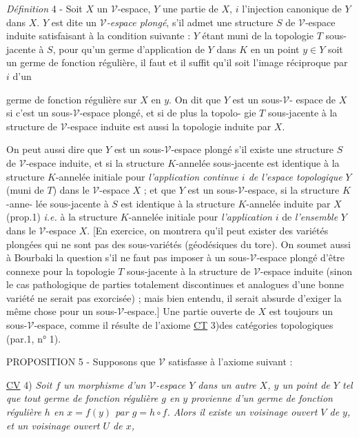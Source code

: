 \emph{Définition} 4 - Soit $X$ un $\mathcal{V}$-espace, $Y$ une partie de $X$, $i$ l'injection
canonique de $Y$ dans $X$. $Y$ est dite un \emph{$\mathcal{V}$-espace plongé}, s'il admet une
structure $S$ de $\mathcal{V}$-espace induite satisfaisant à la condition suivante :
$Y$ étant muni de la topologie $T$ sous-jacente à $S$, pour qu'un germe
d'application de $Y$ dans $K$ en un point $y \in Y$ soit un germe de fonction
régulière, il faut et il suffit qu'il soit l'image réciproque par $i$ d'un

\newpage



germe de fonction régulière sur $X$ en $y$. On dit que $Y$ est un sous-$\mathcal{V}$-
espace de $X$ si c'est un sous-$\mathcal{V}$-espace plongé, et si de plus la topolo-
gie $T$ sous-jacente à la structure de $\mathcal{V}$-espace induite est aussi la
topologie induite par $X$.

On peut aussi dire que $Y$ est un sous-$\mathcal{V}$-espace plongé s'il existe
une structure $S$ de $\mathcal{V}$-espace induite, et si la structure $K$-annelée
sous-jacente est identique à la structure $K$-annelée initiale pour
\emph{l'application continue $i$ de l'espace topologique} $Y$ (muni de $T$) dans le
$\mathcal{V}$-espace $X$ ; et que $Y$ est un sous-$\mathcal{V}$-espace, si la structure $K$-anne-
lée sous-jacente à $S$ est identique à la structure $K$-annelée induite par
$X$ (prop.1) \emph{i.e.} à la structure $K$-annelée initiale pour \emph{l'application} $i$
de \emph{l'ensemble} $Y$ dans le $\mathcal{V}$-espace $X$. [En exercice, on montrera qu'il
peut exister des variétés plongées qui ne sont pas des sous-variétés
(géodésiques du tore). On soumet aussi à Bourbaki la question s'il ne
faut pas imposer à un sous-$\mathcal{V}$-espace plongé d'être connexe pour la
topologie $T$ sous-jacente à la structure de $\mathcal{V}$-espace induite (sinon le
cas pathologique de parties totalement discontinues et analogues d'une
bonne variété ne serait pas exorcisée) ; mais bien entendu, il serait
absurde d'exiger la même chose pour un sous-$\mathcal{V}$-espace.] Une partie
ouverte de $X$ est toujours un sous-$\mathcal{V}$-espace, comme il résulte de
l'axiome \underline{CT} 3)des catégories topologiques (par.1, n° 1).

PROPOSITION 5 - Supposons que $\mathcal{V}$ satisfasse à l'axiome suivant :

\underline{CV} 4) \emph{Soit $f$ un morphisme d'un $\mathcal{V}$-espace $Y$ dans un autre $X$, $y$ un point
de $Y$ tel que tout germe de fonction régulière $g$ en $y$ provienne
d'un germe de fonction régulière $h$ en $x=f(y)$ par $g=h \circ f$. Alors il
existe un voisinage ouvert $V$ de $y$, et un voisinage ouvert $U$ de $x$,}

